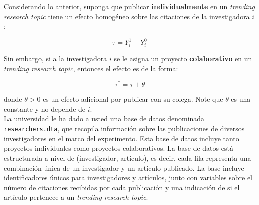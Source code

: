 \documentclass[a4paper, answers, addpoints, 11pt]{exam}
\begin{document}
Considerando lo anterior, suponga que publicar \textbf{individualmente} en un \textit{trending research topic} tiene un efecto homogéneo sobre las citaciones de la investigadora $i$:

\begin{equation*}
    \tau = Y^{1}_{i} - Y^{0}_{i}
\end{equation*}

 Sin embargo, si a la investigadora $i$ se le asigna un proyecto \textbf{colaborativo} en un \textit{trending research topic}, entonces el efecto es de la forma:

\begin{equation*}
    \tau^* = \tau + \theta 
\end{equation*}

donde $\theta > 0$ es un efecto adicional por publicar con su colega. Note que $\theta$ es una constante y no depende de $i$. \\

La universidad le ha dado a usted una base de datos denominada \texttt{researchers.dta}, que recopila información sobre las publicaciones de diversos investigadores en el marco del experimento. Esta base de datos incluye tanto proyectos individuales como proyectos colaborativos. La base de datos está estructurada a nivel de (investigador, artículo), es decir, cada fila representa una combinación única de un investigador y un artículo publicado. La base incluye identificadores únicos para investigadores y artículos, junto con variables sobre el número de citaciones recibidas por cada publicación y una indicación de si el artículo pertenece a un \textit{trending research topic}.
\end{document}
